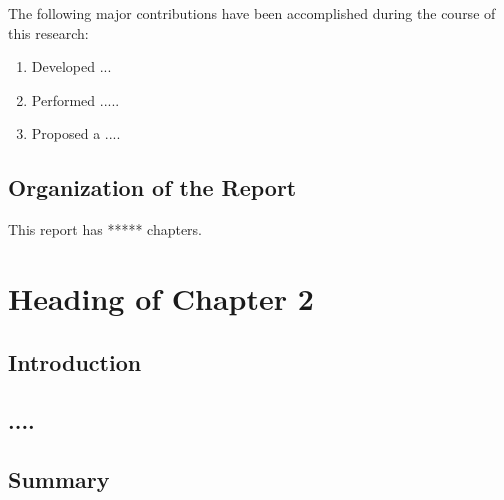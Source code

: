 \documentclass[12pt]{report}
\begin{document}
The following major contributions have been accomplished during the course of this research:

\begin{enumerate}[topsep=0pt]

\item Developed ...

\item Performed .....

\item Proposed a ....

\end{enumerate}






\section{Organization of the Report}

This report has ***** chapters. 
















\chapter{Heading of Chapter 2}

\section{Introduction}



\section{....}



\lipsum[2-4]






\section{Summary}
\end{document}
